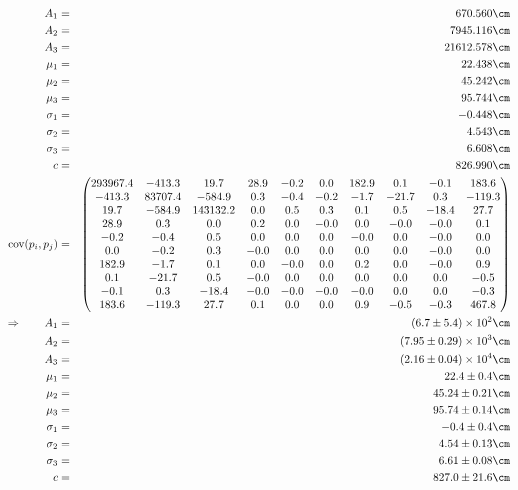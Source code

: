 \begin{eqnarray}
    A_1 &=& 670.560 \cm \nonumber \\
    A_2 &=& 7945.116 \cm \nonumber \\
    A_3 &=& 21612.578 \cm \nonumber \\
    \mu_1 &=& 22.438 \cm \nonumber \\
    \mu_2 &=& 45.242 \cm \nonumber \\
    \mu_3 &=& 95.744 \cm \nonumber \\
    \sigma_1 &=& -0.448 \cm \nonumber \\
    \sigma_2 &=& 4.543 \cm \nonumber \\
    \sigma_3 &=& 6.608 \cm \nonumber \\
    c &=& 826.990 \cm \nonumber \\
    \mathrm{cov}(p_i, p_j) &=& 
    \begin{pmatrix}
        293967.4 &-413.3 &19.7 &28.9 &-0.2 &0.0 &182.9 &0.1 &-0.1 &183.6 \\
        -413.3 &83707.4 &-584.9 &0.3 &-0.4 &-0.2 &-1.7 &-21.7 &0.3 &-119.3 \\
        19.7 &-584.9 &143132.2 &0.0 &0.5 &0.3 &0.1 &0.5 &-18.4 &27.7 \\
        28.9 &0.3 &0.0 &0.2 &0.0 &-0.0 &0.0 &-0.0 &-0.0 &0.1 \\
        -0.2 &-0.4 &0.5 &0.0 &0.0 &0.0 &-0.0 &0.0 &-0.0 &0.0 \\
        0.0 &-0.2 &0.3 &-0.0 &0.0 &0.0 &0.0 &0.0 &-0.0 &0.0 \\
        182.9 &-1.7 &0.1 &0.0 &-0.0 &0.0 &0.2 &0.0 &-0.0 &0.9 \\
        0.1 &-21.7 &0.5 &-0.0 &0.0 &0.0 &0.0 &0.0 &0.0 &-0.5 \\
        -0.1 &0.3 &-18.4 &-0.0 &-0.0 &-0.0 &-0.0 &0.0 &0.0 &-0.3 \\
        183.6 &-119.3 &27.7 &0.1 &0.0 &0.0 &0.9 &-0.5 &-0.3 &467.8 \\
    \end{pmatrix}
\\ \Rightarrow \qquad
    A_1 &=& \left(6.7 \pm 5.4\right) \times 10^{2} \cm\\
    A_2 &=& \left(7.95 \pm 0.29\right) \times 10^{3} \cm\\
    A_3 &=& \left(2.16 \pm 0.04\right) \times 10^{4} \cm\\
    \mu_1 &=& 22.4 \pm 0.4 \cm\\
    \mu_2 &=& 45.24 \pm 0.21 \cm\\
    \mu_3 &=& 95.74 \pm 0.14 \cm\\
    \sigma_1 &=& -0.4 \pm 0.4 \cm\\
    \sigma_2 &=& 4.54 \pm 0.13 \cm\\
    \sigma_3 &=& 6.61 \pm 0.08 \cm\\
    c &=& 827.0 \pm 21.6 \cm
\end{eqnarray}

